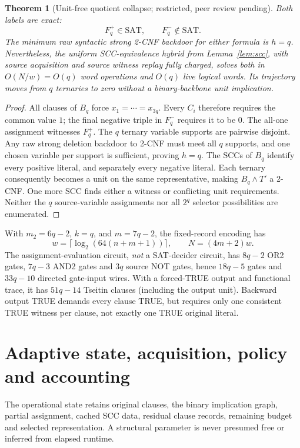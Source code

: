 \documentclass[11pt]{article}
\newtheorem{theorem}{Theorem}
\begin{document}
\begin{theorem}[Unit-free quotient collapse; restricted, peer review pending]
Both labels are exact:
\[
F_q^+\in\mathrm{SAT},\qquad F_q^-\notin\mathrm{SAT}.
\]
The minimum raw syntactic strong 2-CNF backdoor for either formula is $h=q$. Nevertheless, the uniform SCC-equivalence hybrid from Lemma~\ref{lem:scc}, with source acquisition and source witness replay fully charged, solves both in $O(N/w)=O(q)$ word operations and $O(q)$ live logical words. Its trajectory moves from $q$ ternaries to zero without a binary-backbone unit implication.
\end{theorem}
\begin{proof}
All clauses of $B_q$ force $x_1=\cdots=x_{3q}$. Every $C_i$ therefore requires the common value $1$; the final negative triple in $F_q^-$ requires it to be $0$. The all-one assignment witnesses $F_q^+$. The $q$ ternary variable supports are pairwise disjoint. Any raw strong deletion backdoor to 2-CNF must meet all $q$ supports, and one chosen variable per support is sufficient, proving $h=q$. The SCCs of $B_q$ identify every positive literal, and separately every negative literal. Each ternary consequently becomes a unit on the same representative, making $B_q\wedge T'$ a 2-CNF. One more SCC finds either a witness or conflicting unit requirements. Neither the $q$ source-variable assignments nor all $2^q$ selector possibilities are enumerated.
\end{proof}

With $m_2=6q-2$, $k=q$, and $m=7q-2$, the fixed-record encoding has
\[
w=\lceil\log_2(64(n+m+1))\rceil,\qquad N=(4m+2)w.
\]
The assignment-evaluation circuit, \emph{not} a SAT-decider circuit, has $8q-2$ OR2 gates, $7q-3$ AND2 gates and $3q$ source NOT gates, hence $18q-5$ gates and $33q-10$ directed gate-input wires. With a forced-TRUE output and functional trace, it has $51q-14$ Tseitin clauses (including the output unit). Backward output TRUE demands every clause TRUE, but requires only one consistent TRUE witness per clause, not exactly one TRUE original literal.

\section{Adaptive state, acquisition, policy and accounting}
The operational state retains original clauses, the binary implication graph, partial assignment, cached SCC data, residual clause records, remaining budget and selected representation. A structural parameter is never presumed free or inferred from elapsed runtime.
\end{document}
